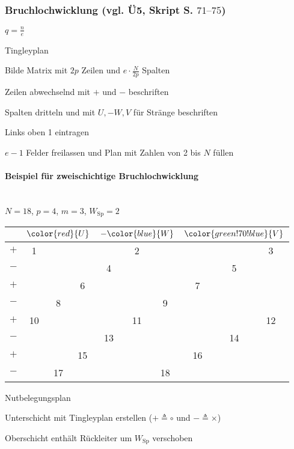\begin{sectionbox}
\subsubsection{Bruchlochwicklung (vgl. Ü5, Skript S. $\numrange{71}{75}$)}
$q = \frac{n}{e}$

\begin{cookbox}{Tingleyplan}
\item Bilde Matrix mit $2p$ Zeilen und $e\cdot\frac{N}{2p}$ Spalten
\item Zeilen abwechselnd mit $+$ und $-$ beschriften
\item Spalten dritteln und mit $U,-W,V$ für Stränge beschriften
\item Links oben 1 eintragen
\item $e-1$ Felder freilassen und Plan mit Zahlen von 2 bis $N$ füllen
\end{cookbox}

\paragraph{Beispiel für zweischichtige Bruchlochwicklung}\mbox{}\\
$N = 18$, $p = 4$, $m = 3$, $W_\text{Sp} = 2$

\begin{tabularx}{\columnwidth}{|C||C|C|C|C|C|C|C|C|C|}
\hline
&  &  & \\ \hline
$+$ & 1 & & & & 2 & & & & 3\\ \hline
$-$ & & & & 4 & & & & 5 & \\ \hline
$+$ & & & 6 & & & & 7 & & \\ \hline
$-$ & & 8 & & & & 9 & & & \\ \hline
$+$ & 10 & & & & 11 & & & & 12\\ \hline
$-$ & & & & 13 & & & & 14 & \\ \hline
$+$ & & & 15 & & & & 16 & & \\ \hline
$-$ & &17 & & & & 18 & & & \\ \hline
\end{tabularx}

\begin{cookbox}{Nutbelegungsplan}
\item Unterschicht mit Tingleyplan erstellen ($+ \triangleq \circ$ und $- \triangleq \times$)
\item Oberschicht enthält Rückleiter um $W_\text{Sp}$ verschoben
\end{cookbox}

\begin{minipage}{.5\columnwidth}
    \begin{center}
        
    \end{center}
\end{minipage}
\begin{minipage}{.5\columnwidth}
    \begin{center}
        
    \end{center}
\end{minipage}

\end{sectionbox}
